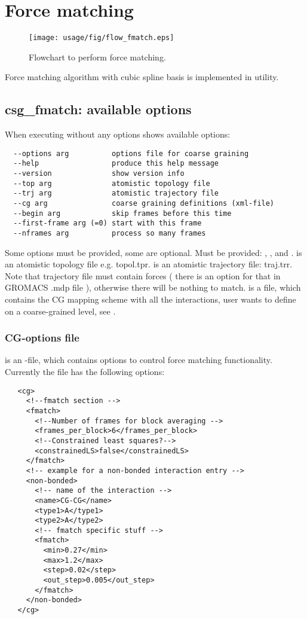 \section{Force matching}
\sasha
\begin{figure}
   \centering
   \texttt{[image: usage/fig/flow\_fmatch.eps]}
   \caption{Flowchart to perform force matching.}
\end{figure}
Force matching algorithm with cubic spline basis is implemented in  utility.

\subsection{csg\_fmatch: available options}
When executing without any options  shows available options:
\begin{verbatim}
  --options arg          options file for coarse graining
  --help                 produce this help message
  --version              show version info
  --top arg              atomistic topology file
  --trj arg              atomistic trajectory file
  --cg arg               coarse graining definitions (xml-file)
  --begin arg            skip frames before this time
  --first-frame arg (=0) start with this frame
  --nframes arg          process so many frames
\end{verbatim}
Some options must be provided, some are optional. Must be provided: , ,  and .  is an atomistic topology file e.g. topol.tpr.  is an atomistic trajectory file: traj.trr. Note that trajectory file must contain forces ( there is an option for that in GROMACS .mdp file ), otherwise there will be nothing to match.  is a file, which contains the CG mapping scheme with all the interactions, user wants to define on a coarse-grained level, see .

\subsubsection{CG-options file}
 is an \xml-file, which contains options to control force matching functionality. 
Currently the file has the following options:

\begin{lstlisting}
   <cg>
     <!--fmatch section -->
     <fmatch>
       <!--Number of frames for block averaging -->
       <frames_per_block>6</frames_per_block>
       <!--Constrained least squares?-->
       <constrainedLS>false</constrainedLS>
     </fmatch>
     <!-- example for a non-bonded interaction entry -->
     <non-bonded>
       <!-- name of the interaction -->
       <name>CG-CG</name>
       <type1>A</type1>
       <type2>A</type2>
       <!-- fmatch specific stuff -->
       <fmatch>
         <min>0.27</min>
         <max>1.2</max>
         <step>0.02</step>
         <out_step>0.005</out_step>
       </fmatch>
     </non-bonded>
   </cg>
\end{lstlisting}

